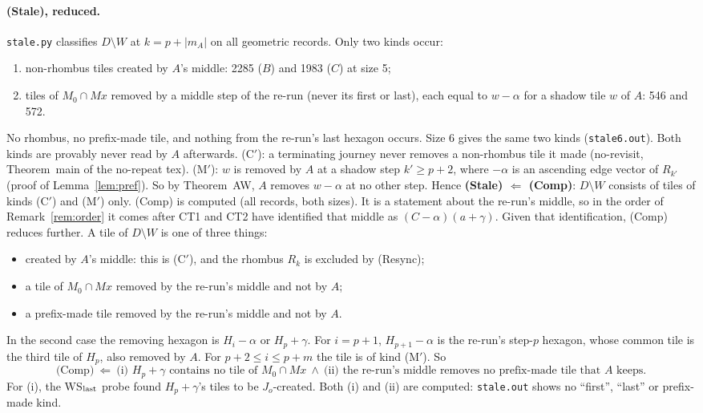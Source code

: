 \documentclass[11pt]{article}
\theoremstyle{definition}\newtheorem{definition}[theorem]{Definition}\newtheorem{remark}[theorem]{Remark}
\begin{document}
\paragraph{(Stale), reduced.} \texttt{stale.py} classifies $D\setminus W$ at $k=p+|m_A|$ on all geometric records. Only two kinds occur:
\begin{enumerate}
\item[(C$'$)] non-rhombus tiles created by $A$'s middle: 2285 ($B$) and 1983 ($C$) at size 5;
\item[(M$'$)] tiles of $M_0\cap Mx$ removed by a middle step of the re-run (never its first or last), each equal to $w-\alpha$ for a shadow tile $w$ of $A$: 546 and 572.
\end{enumerate}
No rhombus, no prefix-made tile, and nothing from the re-run's last hexagon occurs. Size 6 gives the same two kinds (\texttt{stale6.out}).
Both kinds are provably never read by $A$ afterwards. (C$'$): a terminating journey never removes a non-rhombus tile it made (no-revisit, Theorem~main of the no-repeat tex). (M$'$): $w$ is removed by $A$ at a shadow step $k'\ge p+2$, where $-\alpha$ is an ascending edge vector of $R_{k'}$ (proof of Lemma~\ref{lem:pref}). So by Theorem~AW, $A$ removes $w-\alpha$ at no other step.
Hence \textbf{(Stale) $\Leftarrow$ (Comp)}: $D\setminus W$ consists of tiles of kinds (C$'$) and (M$'$) only. (Comp) is computed (all records, both sizes). It is a statement about the re-run's middle, so in the order of Remark~\ref{rem:order} it comes after CT1 and CT2 have identified that middle as $(C-\alpha)(a+\gamma)$.
Given that identification, (Comp) reduces further. A tile of $D\setminus W$ is one of three things:
\begin{itemize}
\item created by $A$'s middle: this is (C$'$), and the rhombus $R_k$ is excluded by (Resync);
\item a tile of $M_0\cap Mx$ removed by the re-run's middle and not by $A$;
\item a prefix-made tile removed by the re-run's middle and not by $A$.
\end{itemize}
In the second case the removing hexagon is $H_i-\alpha$ or $H_p+\gamma$. For $i=p+1$, $H_{p+1}-\alpha$ is the re-run's step-$p$ hexagon, whose common tile is the third tile of $H_p$, also removed by $A$. For $p+2\le i\le p+m$ the tile is of kind (M$'$). So
\[\text{(Comp)}\ \Leftarrow\ \text{(i) $H_p+\gamma$ contains no tile of $M_0\cap Mx$}\ \wedge\ \text{(ii) the re-run's middle removes no prefix-made tile that $A$ keeps.}\]
For (i), the WS$_{\rm last}$ probe found $H_p+\gamma$'s tiles to be $J_o$-created. Both (i) and (ii) are computed: \texttt{stale.out} shows no ``first'', ``last'' or prefix-made kind.
\end{document}
